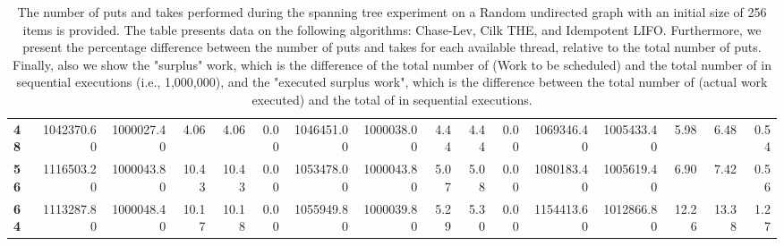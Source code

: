 \begin{table}[!ht]
{\begin{tabular}{lrrrrrrrrrrrrrrr}
\textbf{48} & 1042370.60 & 1000027.40 &           4.06 &        4.06 &                 0.00 & 1046451.00 & 1000038.00 &           4.44 &        4.44 &                 0.00 &      1069346.40 & 1005433.40 &           5.98 &        6.48 &                 0.54 \\
\textbf{56} & 1116503.20 & 1000043.80 &          10.43 &       10.43 &                 0.00 & 1053478.00 & 1000043.80 &           5.07 &        5.08 &                 0.00 &      1080183.40 & 1005619.40 &           6.90 &        7.42 &                 0.56 \\
\textbf{64} & 1113287.80 & 1000048.40 &          10.17 &       10.18 &                 0.00 & 1055949.80 & 1000039.80 &           5.29 &        5.30 &                 0.00 &      1154413.60 & 1012866.80 &          12.26 &       13.38 &                 1.27 \\
\bottomrule
\end{tabular}}
\label{difference-Random_undirected-256-CHASELEV-CILK-IDEMPOTENT_LIFO}
\caption{The number of puts and takes performed during the
    spanning tree experiment on a Random undirected graph with an initial size
    of 256 items is provided. The table presents data on the
    following algorithms: Chase-Lev, Cilk THE, and
    Idempotent LIFO. Furthermore, we present the percentage difference
    between the number of puts and takes for each available thread,
    relative to the total number of puts. Finally, also we show the
    "surplus" work, which is the difference of the total number of
    \Puts (Work to be scheduled) and the total number of \Puts in
    sequential executions (i.e., 1,000,000), and the "executed surplus
    work", which is the difference between the total number of \Takes
    (actual work executed) and the total of \Takes in sequential
    executions.}
\end{table}
